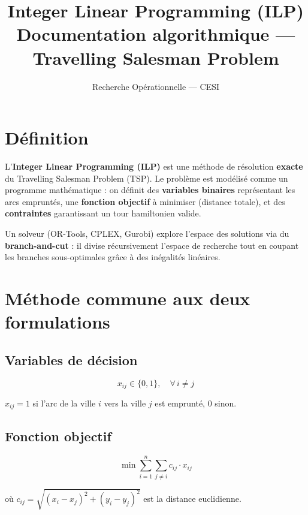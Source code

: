 \documentclass[12pt, a4paper]{article}
\title{
  \textbf{Integer Linear Programming (ILP)}\\
  \large Documentation algorithmique --- Travelling Salesman Problem
}
\author{Recherche Opérationnelle --- CESI}
\date{}
\begin{document}
\maketitle
\tableofcontents
\newpage

\section{Définition}

L'\textbf{Integer Linear Programming (ILP)} est une méthode de résolution \textbf{exacte}
du Travelling Salesman Problem (TSP). Le problème est modélisé comme un programme
mathématique : on définit des \textbf{variables binaires} représentant les arcs empruntés,
une \textbf{fonction objectif} à minimiser (distance totale), et des \textbf{contraintes}
garantissant un tour hamiltonien valide.

Un solveur (OR-Tools, CPLEX, Gurobi) explore l'espace des solutions via du
\textbf{branch-and-cut} : il divise récursivement l'espace de recherche tout en coupant
les branches sous-optimales grâce à des inégalités linéaires.

\section{Méthode commune aux deux formulations}

\subsection{Variables de décision}

\begin{equation}
  x_{ij} \in \{0, 1\}, \quad \forall\, i \neq j
\end{equation}

$x_{ij} = 1$ si l'arc de la ville $i$ vers la ville $j$ est emprunté, $0$ sinon.

\subsection{Fonction objectif}

\begin{equation}
  \min \sum_{i=1}^{n} \sum_{j \neq i} c_{ij} \cdot x_{ij}
\end{equation}

où $c_{ij} = \sqrt{(x_i - x_j)^2 + (y_i - y_j)^2}$ est la distance euclidienne.
\end{document}
